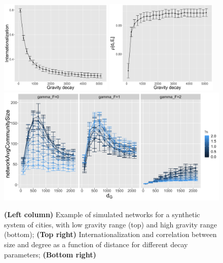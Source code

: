 \documentclass[10pt,letterpaper]{article}
\newcommand{\ea}[1]{{\color{blue}  #1}}
\begin{document}
\begin{figure}
\begin{center}
\begin{minipage}[c]{0.25\textwidth}
    \end{minipage}
    \begin{minipage}[c]{0.6\linewidth}
     \includegraphics[width=0.48\textwidth]{figures/internationalization-gravityDecay_errorbars.png}
    \includegraphics[width=0.48\textwidth]{figures/rhoDegreeSize-gravityDecay_errorbars.png}\\
    \includegraphics[width=\textwidth]{figures/networkAvgCommunitySize_countryGravityDecay2100_gammaDestination0_facetwrapgammaOrigin_colorgammaSectors.png}
    \end{minipage}
    \end{center}
    \caption{\footnotesize\textbf{(Left column)} Example of simulated networks for a synthetic system of cities, with low gravity range (top) and high gravity range (bottom); \textbf{(Top right)} Internationalization and correlation between size and degree as a function of \ea{distance for different decay parameters}; \textbf{(Bottom right)}}
\end{figure}


\footnotesize


\begin{multicols}{2}




\end{multicols}
\end{document}
